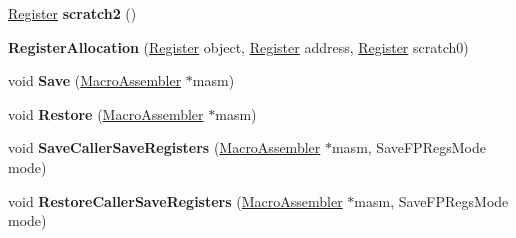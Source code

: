 \begin{DoxyCompactItemize}
\item 
\hyperlink{structv8_1_1internal_1_1_register}{Register} {\bfseries scratch2} ()\hypertarget{classv8_1_1internal_1_1_record_write_stub_1_1_register_allocation_a66e477e37010ec510f0679eaf2189458}{}\label{classv8_1_1internal_1_1_record_write_stub_1_1_register_allocation_a66e477e37010ec510f0679eaf2189458}

\item 
{\bfseries Register\+Allocation} (\hyperlink{structv8_1_1internal_1_1_register}{Register} object, \hyperlink{structv8_1_1internal_1_1_register}{Register} address, \hyperlink{structv8_1_1internal_1_1_register}{Register} scratch0)\hypertarget{classv8_1_1internal_1_1_record_write_stub_1_1_register_allocation_a9bd2c5bd869faf743a61ac1a0e89a8b3}{}\label{classv8_1_1internal_1_1_record_write_stub_1_1_register_allocation_a9bd2c5bd869faf743a61ac1a0e89a8b3}

\item 
void {\bfseries Save} (\hyperlink{classv8_1_1internal_1_1_macro_assembler}{Macro\+Assembler} $\ast$masm)\hypertarget{classv8_1_1internal_1_1_record_write_stub_1_1_register_allocation_a76f90ec53d09edfeb4a3de14141c921d}{}\label{classv8_1_1internal_1_1_record_write_stub_1_1_register_allocation_a76f90ec53d09edfeb4a3de14141c921d}

\item 
void {\bfseries Restore} (\hyperlink{classv8_1_1internal_1_1_macro_assembler}{Macro\+Assembler} $\ast$masm)\hypertarget{classv8_1_1internal_1_1_record_write_stub_1_1_register_allocation_a391db63ae1afc97c528cf3b5e92b9c2a}{}\label{classv8_1_1internal_1_1_record_write_stub_1_1_register_allocation_a391db63ae1afc97c528cf3b5e92b9c2a}

\item 
void {\bfseries Save\+Caller\+Save\+Registers} (\hyperlink{classv8_1_1internal_1_1_macro_assembler}{Macro\+Assembler} $\ast$masm, Save\+F\+P\+Regs\+Mode mode)\hypertarget{classv8_1_1internal_1_1_record_write_stub_1_1_register_allocation_a676d8a1bb19a5746cfc613e7374253e0}{}\label{classv8_1_1internal_1_1_record_write_stub_1_1_register_allocation_a676d8a1bb19a5746cfc613e7374253e0}

\item 
void {\bfseries Restore\+Caller\+Save\+Registers} (\hyperlink{classv8_1_1internal_1_1_macro_assembler}{Macro\+Assembler} $\ast$masm, Save\+F\+P\+Regs\+Mode mode)\hypertarget{classv8_1_1internal_1_1_record_write_stub_1_1_register_allocation_ab0958eb63ba22b285852dcc0cc87c285}{}\label{classv8_1_1internal_1_1_record_write_stub_1_1_register_allocation_ab0958eb63ba22b285852dcc0cc87c285}


\end{DoxyCompactItemize}
